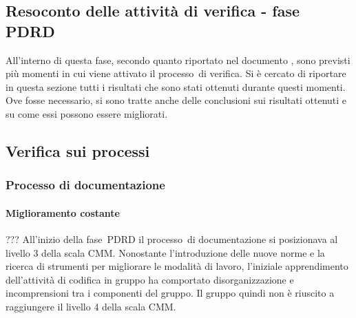 \documentclass[../PianoDiQualifica.tex]{subfiles}
\begin{document}
\begin{appendices}
\section{Resoconto delle attività di verifica - fase PDRD}
All'interno di questa fase\g, secondo quanto riportato nel documento \pianodiprogetto, sono previsti più momenti in cui viene attivato il processo\g\ di verifica. Si è cercato di riportare in questa sezione tutti i risultati che sono stati ottenuti durante questi momenti. Ove fosse necessario, si sono tratte anche delle conclusioni sui risultati ottenuti e su come essi possono essere migliorati.
	
	\subsection{Verifica sui processi}
		\subsubsection{Processo di documentazione}
			\paragraph{Miglioramento costante}
			??? All'inizio della fase\g\ PDRD il processo\g\ di documentazione si posizionava al livello 3 della scala CMM\g.
			Nonostante l'introduzione delle nuove norme e la ricerca di strumenti per migliorare le modalità di lavoro, l'iniziale apprendimento dell'attività di codifica in gruppo ha comportato disorganizzazione e incomprensioni tra i componenti del gruppo. Il gruppo quindi non è riuscito a raggiungere il livello 4 della scala CMM\g.
			

\end{appendices}
\end{document}
